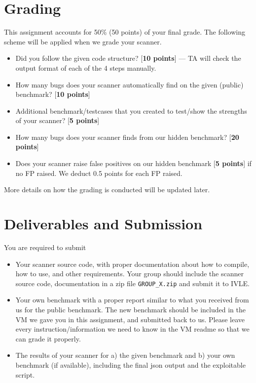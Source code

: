 \documentclass{article}[10pt]
\begin{document}
\section{Grading}
This assignment accounts for 50\% (50 points) of your final grade. The following scheme will be applied when we grade your scanner.
	\begin{itemize}
	\item Did you follow the given code structure? [{\bf 10 points}] --- TA will check the output format of each of the 4 steps manually.
	\item How many bugs does your scanner automatically find on the given (public) benchmark? [{\bf 10 points}]
	\item Additional benchmark/testcases that you created to test/show the strengths of your scanner? [{\bf 5 points}]
	\item How many bugs does your scanner finds from our hidden benchmark? [{\bf 20 points}]
	\item Does your scanner raise false positives on our hidden benchmark [{\bf 5 points}] if no FP raised. We deduct 0.5 points for each FP raised.
	\end{itemize}

More details on how the grading is conducted will be updated later.

\section{Deliverables and Submission}
\label{deliverables}
You are required to submit
\begin{itemize}
	\item Your scanner source code, with proper documentation about how to compile, how to use, and other requirements. Your group should include the scanner source code, documentation in a zip file {\tt GROUP\_X.zip} and submit it to IVLE.
	
	\item Your own benchmark with a proper report similar to what you received from us for the public benchmark. The new benchmark should be included in the VM we gave you in this assignment, and submitted back to us. Please leave every instruction/information we need to know in the VM readme so that we can grade it properly.

	\item The results of your scanner for a) the given benchmark and b) your own benchmark (if available), including the final json output and the exploitable script.	
\end{itemize}
\end{document}
